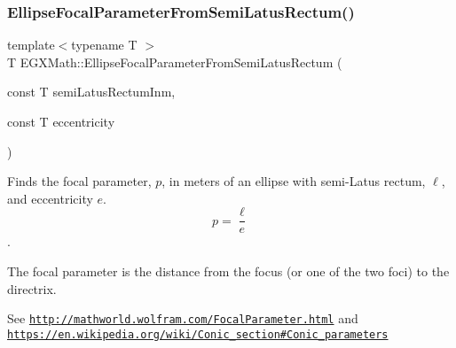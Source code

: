 \mbox{\label{group___e_g_x_math-_geometry-2_d-_ellipse-_focal_parameter_gaf957cf9131d3998bfe944f6234a133e6}} 
\subsubsection{\texorpdfstring{Ellipse\+Focal\+Parameter\+From\+Semi\+Latus\+Rectum()}{EllipseFocalParameterFromSemiLatusRectum()}}
{\footnotesize\ttfamily template$<$typename T $>$ \\
T E\+G\+X\+Math\+::\+Ellipse\+Focal\+Parameter\+From\+Semi\+Latus\+Rectum (\begin{DoxyParamCaption}\item[{const T}]{semi\+Latus\+Rectum\+Inm,  }\item[{const T}]{eccentricity }\end{DoxyParamCaption})}



Finds the focal parameter, $p$, in meters of an ellipse with semi-\/\+Latus rectum, $\ell$, and eccentricity $e$. \[ p=\frac{\ell}{e} \]. 

The focal parameter is the distance from the focus (or one of the two foci) to the directrix.

See \href{http://mathworld.wolfram.com/FocalParameter.html}{\tt http\+://mathworld.\+wolfram.\+com/\+Focal\+Parameter.\+html} and \href{https://en.wikipedia.org/wiki/Conic_section#Conic_parameters}{\tt https\+://en.\+wikipedia.\+org/wiki/\+Conic\+\_\+section\#\+Conic\+\_\+parameters}


